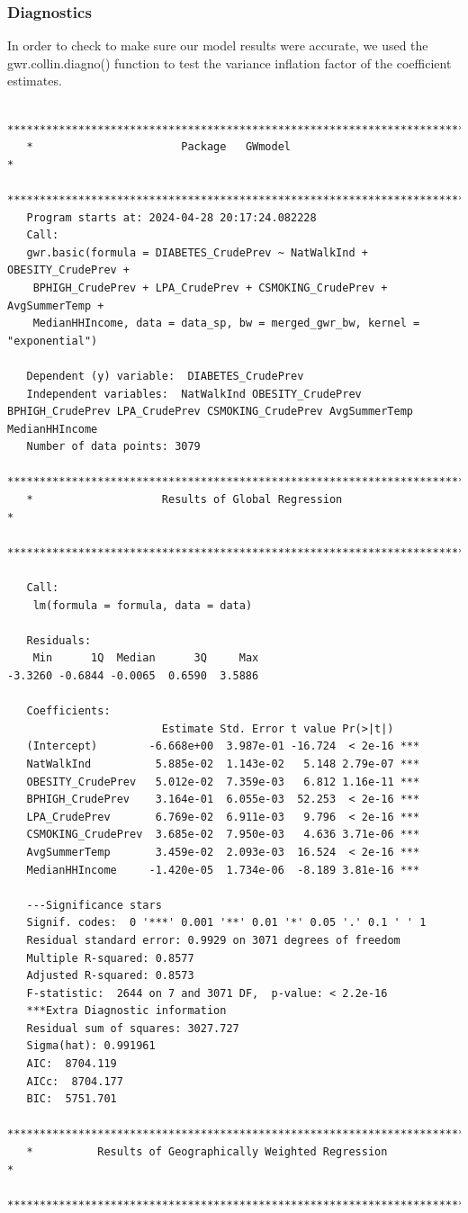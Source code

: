 \documentclass[
]{article}
\begin{document}
\subsubsection{Diagnostics}\label{diagnostics}

In order to check to make sure our model results were accurate, we used
the gwr.collin.diagno() function to test the variance inflation factor
of the coefficient estimates.

\begin{verbatim}
   ***********************************************************************
   *                       Package   GWmodel                             *
   ***********************************************************************
   Program starts at: 2024-04-28 20:17:24.082228 
   Call:
   gwr.basic(formula = DIABETES_CrudePrev ~ NatWalkInd + OBESITY_CrudePrev + 
    BPHIGH_CrudePrev + LPA_CrudePrev + CSMOKING_CrudePrev + AvgSummerTemp + 
    MedianHHIncome, data = data_sp, bw = merged_gwr_bw, kernel = "exponential")

   Dependent (y) variable:  DIABETES_CrudePrev
   Independent variables:  NatWalkInd OBESITY_CrudePrev BPHIGH_CrudePrev LPA_CrudePrev CSMOKING_CrudePrev AvgSummerTemp MedianHHIncome
   Number of data points: 3079
   ***********************************************************************
   *                    Results of Global Regression                     *
   ***********************************************************************

   Call:
    lm(formula = formula, data = data)

   Residuals:
    Min      1Q  Median      3Q     Max 
-3.3260 -0.6844 -0.0065  0.6590  3.5886 

   Coefficients:
                        Estimate Std. Error t value Pr(>|t|)    
   (Intercept)        -6.668e+00  3.987e-01 -16.724  < 2e-16 ***
   NatWalkInd          5.885e-02  1.143e-02   5.148 2.79e-07 ***
   OBESITY_CrudePrev   5.012e-02  7.359e-03   6.812 1.16e-11 ***
   BPHIGH_CrudePrev    3.164e-01  6.055e-03  52.253  < 2e-16 ***
   LPA_CrudePrev       6.769e-02  6.911e-03   9.796  < 2e-16 ***
   CSMOKING_CrudePrev  3.685e-02  7.950e-03   4.636 3.71e-06 ***
   AvgSummerTemp       3.459e-02  2.093e-03  16.524  < 2e-16 ***
   MedianHHIncome     -1.420e-05  1.734e-06  -8.189 3.81e-16 ***

   ---Significance stars
   Signif. codes:  0 '***' 0.001 '**' 0.01 '*' 0.05 '.' 0.1 ' ' 1 
   Residual standard error: 0.9929 on 3071 degrees of freedom
   Multiple R-squared: 0.8577
   Adjusted R-squared: 0.8573 
   F-statistic:  2644 on 7 and 3071 DF,  p-value: < 2.2e-16 
   ***Extra Diagnostic information
   Residual sum of squares: 3027.727
   Sigma(hat): 0.991961
   AIC:  8704.119
   AICc:  8704.177
   BIC:  5751.701
   ***********************************************************************
   *          Results of Geographically Weighted Regression              *
   ***********************************************************************


\end{verbatim}
\end{document}
